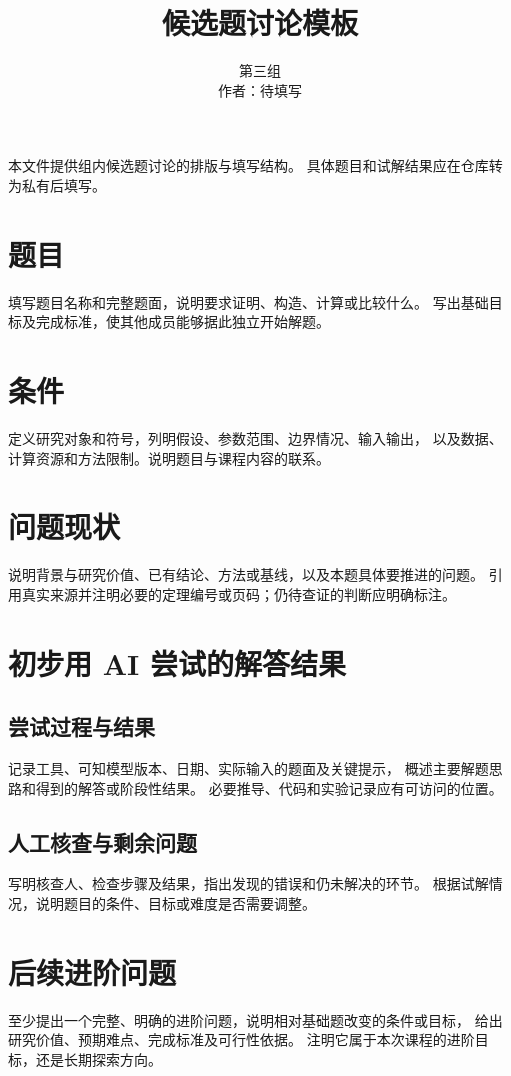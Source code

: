 \documentclass[UTF8,a4paper,zihao=-4,fontset=fandol]{ctexart}
\title{\heiti\zihao{2}候选题讨论模板}
\author{\zihao{-4}第三组\\\zihao{-4}作者：待填写}
\date{}
\numberwithin{equation}{section}
\numberwithin{figure}{section}
\numberwithin{table}{section}
\theoremstyle{definition}
\begin{document}
\maketitle

本文件提供组内候选题讨论的排版与填写结构。
具体题目和试解结果应在仓库转为私有后填写。

\section{题目}
\label{sec:problem}

填写题目名称和完整题面，说明要求证明、构造、计算或比较什么。
写出基础目标及完成标准，使其他成员能够据此独立开始解题。

\section{条件}
\label{sec:conditions}

定义研究对象和符号，列明假设、参数范围、边界情况、输入输出，
以及数据、计算资源和方法限制。说明题目与课程内容的联系。

\section{问题现状}
\label{sec:background}

说明背景与研究价值、已有结论、方法或基线，以及本题具体要推进的问题。
引用真实来源并注明必要的定理编号或页码；仍待查证的判断应明确标注。

\section{初步用 AI 尝试的解答结果}
\label{sec:ai}

\subsection{尝试过程与结果}

记录工具、可知模型版本、日期、实际输入的题面及关键提示，
概述主要解题思路和得到的解答或阶段性结果。
必要推导、代码和实验记录应有可访问的位置。

\subsection{人工核查与剩余问题}

写明核查人、检查步骤及结果，指出发现的错误和仍未解决的环节。
根据试解情况，说明题目的条件、目标或难度是否需要调整。

\section{后续进阶问题}
\label{sec:extensions}

至少提出一个完整、明确的进阶问题，说明相对基础题改变的条件或目标，
给出研究价值、预期难点、完成标准及可行性依据。
注明它属于本次课程的进阶目标，还是长期探索方向。

% 
% 
\end{document}
